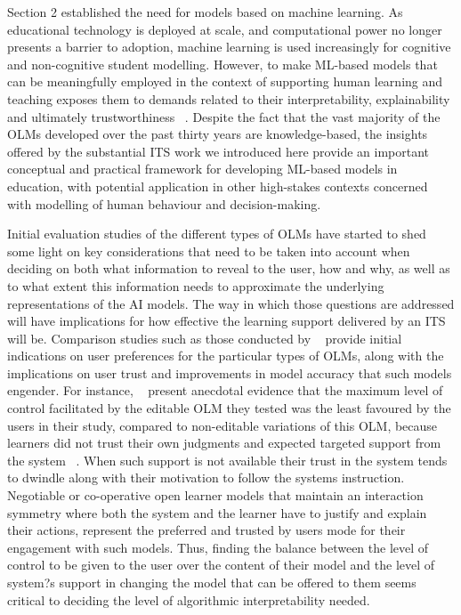 \documentclass{article}
\begin{document}
Section 2 established the need for models based on machine learning. As educational technology is deployed at scale, and computational power no longer presents a barrier to adoption, machine learning is used increasingly for cognitive and non-cognitive student modelling. However, to make ML-based models that can be meaningfully employed in the context of supporting human learning and teaching exposes them to demands related to their interpretability, explainability and ultimately trustworthiness ~\cite{WellerWHI2017}. Despite the fact that the vast majority of the OLMs developed over the past thirty years are knowledge-based, the insights offered by the substantial ITS work we introduced here provide an important conceptual and practical framework for developing ML-based models in education, with potential application in other high-stakes contexts concerned with modelling of human behaviour and decision-making.

Initial evaluation studies of the different types of OLMs have started to shed some light on key considerations that need to be taken into account when deciding on both what information to reveal to the user, how and why, as well as to what extent this information needs to approximate the underlying representations of the AI models. The way in which those questions are addressed will have implications for how effective the learning support delivered by an ITS will be.  Comparison studies such as those conducted by ~\cite{Mabbott,KerlyThesis2009} provide initial indications on user preferences for the particular types of OLMs, along with the implications on user trust and improvements in model accuracy that such models engender. For instance, ~\cite{Mabbott} present anecdotal evidence that the maximum level of control facilitated by the editable OLM they tested was the least favoured by the users in their study, compared to non-editable variations of this OLM, because learners did not trust their own judgments and expected targeted support from the system ~\cite{Mabbott}. When such support is not available their trust in the system tends to dwindle along with their motivation to follow the systems instruction. Negotiable or co-operative open learner models that maintain an interaction symmetry where both the system and the learner have to justify and explain their actions, represent the preferred and trusted by users mode for their engagement with such models. Thus, finding the balance between the level of control to be given to the user over the content of their model and the level of system?s support in changing the model that can be offered to them seems critical to deciding the level of algorithmic interpretability needed.
\end{document}
